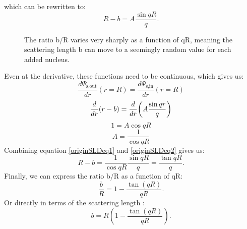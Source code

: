 which can be rewritten to:
\begin{equation}\label{originSLDeq1}
	R - b = A\frac{\sin{qR}}{q}.
\end{equation}
\begin{figure}
	\centering
	\def\svgwidth{\textwidth}
	
	\caption{The ratio b/R varies very sharply as a function of qR, meaning the scattering length b can move to a seemingly random value for each added nucleus.}
	\label{neutronscatteringlength}
\end{figure}
Even at the derivative, these functions need to be continuous, which gives us:
\begin{equation}
	\frac{d\Psi_{\textrm{s,out}}}{dr} (r = R) = \frac{d\Psi_{\textrm{s,in}}}{dr} (r = R) 
\end{equation}	
\begin{equation}
	\frac{d}{dr}(r - b) = \frac{d}{dr}\qty(A\frac{\sin{qr}}{q})
\end{equation}
\begin{equation}
	1 = A \cos qR
\end{equation}	
\begin{equation}
	A = \frac{1}{\cos{qR}}\label{originSLDeq2}
\end{equation}
Combining equation \ref{originSLDeq1} and \ref{originSLDeq2} gives us:
\begin{equation}
	R - b = \frac{1}{\cos qR} \frac{\sin qR}{q} =  \frac{\tan qR}{q}.
\end{equation}
Finally, we can express the ratio b/R as a function of qR:
\begin{equation}\label{fraction_R}
	\frac{b}{R} = 1 - \frac{\tan(qR)}{qR}.
\end{equation}
Or directly in terms of the scattering length  \cite{hammouda}:
\begin{equation}\label{scattering_length_expression}
	b = R(1 - \frac{\tan(qR)}{qR}).
\end{equation}
